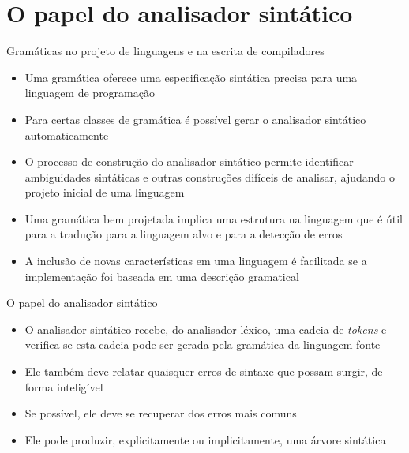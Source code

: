 \section{O papel do analisador sintático}

\begin{frame}[fragile]{Gramáticas no projeto de linguagens e na escrita de compiladores}

    \begin{itemize}
        \item Uma gramática oferece uma especificação sintática precisa para uma linguagem de programação
        \pause

        \item Para certas classes de gramática é possível gerar o analisador sintático automaticamente
        \pause

        \item O processo de construção do analisador sintático permite identificar ambiguidades sintáticas e outras construções difíceis de analisar, ajudando o
            projeto inicial de uma linguagem
        \pause

        \item Uma gramática bem projetada implica uma estrutura na linguagem que é útil para a tradução para a linguagem alvo e para a detecção de erros
        \pause

        \item A inclusão de novas características em uma linguagem é facilitada se a implementação foi baseada em uma descrição gramatical
    \end{itemize}

\end{frame}

\begin{frame}[fragile]{O papel do analisador sintático}

    \begin{itemize}
        \item O analisador sintático recebe, do analisador léxico, uma cadeia de \textit{tokens} e verifica se esta cadeia pode ser gerada pela gramática da
            linguagem-fonte
        \pause

        \item Ele também deve relatar quaisquer erros de sintaxe que possam surgir, de forma inteligível
        \pause

        \item Se possível, ele deve se recuperar dos erros mais comuns
        \pause

        \item Ele pode produzir, explicitamente ou implicitamente, uma árvore sintática 
    \end{itemize}

\end{frame}

